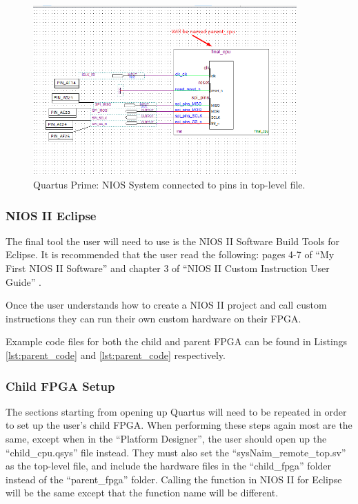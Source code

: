 \begin{figure}[!h]
    \centering
    \includegraphics[width=0.9\textwidth]{05_evaluation/images/qs_cpu_connected.png}
    \caption{Quartus Prime: NIOS System connected to pins in top-level file.}
    \label{fig:qp_connected}
\end{figure}

\subsubsection{NIOS II Eclipse}

The final tool the user will need to use is the NIOS II Software Build Tools for Eclipse. It is recommended that the user read the following: pages 4-7 of “My First NIOS II Software” \cite{nios-ii-first-prog} and chapter 3 of “NIOS II Custom Instruction User Guide” \cite{nios-ii-inst-guide}.

Once the user understands how to create a NIOS II project and call custom instructions they can run their own custom hardware on their FPGA.

Example code files for both the child and parent FPGA can be found in Listings \ref{lst:parent_code} and \ref{lst:parent_code} respectively.

\subsubsection{Child FPGA Setup}

The sections starting from opening up Quartus will need to be repeated in order to set up the user's child FPGA. When performing these steps again most are the same, except when in the “Platform Designer”, the user should open up the “child\_cpu.qsys” file instead. They must also set the “sysNaim\_remote\_top.sv” as the top-level file, and include the hardware files in the “child\_fpga” folder instead of the “parent\_fpga” folder. Calling the function in NIOS II for Eclipse will be the same except that the function name will be different.

